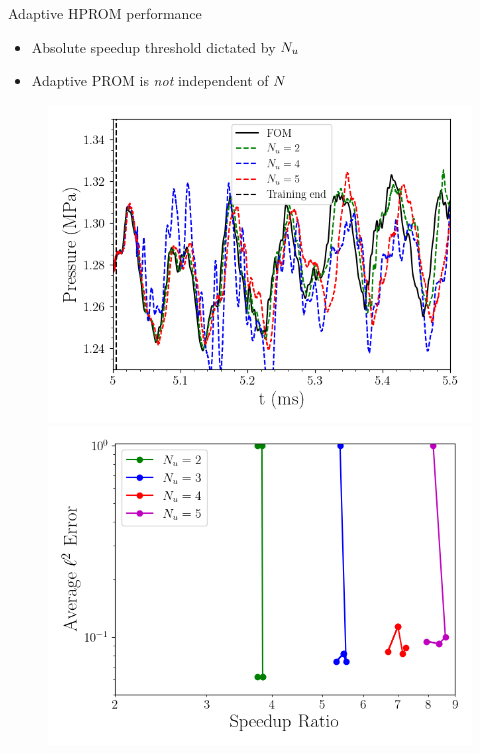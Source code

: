 \documentclass[]{beamer}
\begin{document}
\begin{frame}{Adaptive HPROM performance}
	\begin{itemize}
		\item Absolute speedup threshold dictated by $N_u$
		\item Adaptive PROM is \textit{not} independent of $N$
	\end{itemize}
	\begin{figure}
		\begin{minipage}{0.49\linewidth}
			\includegraphics[width=0.99\linewidth]{Images/experiments/cvrc/pressure_probe_wrt_iter.png}
		\end{minipage}
		\begin{minipage}{0.49\linewidth}
			\includegraphics[width=0.99\linewidth]{Images/experiments/cvrc/pareto_wrt_iters_Average_errorRaw_pareto.png}
		\end{minipage}
	\end{figure}
\end{frame}
\end{document}
